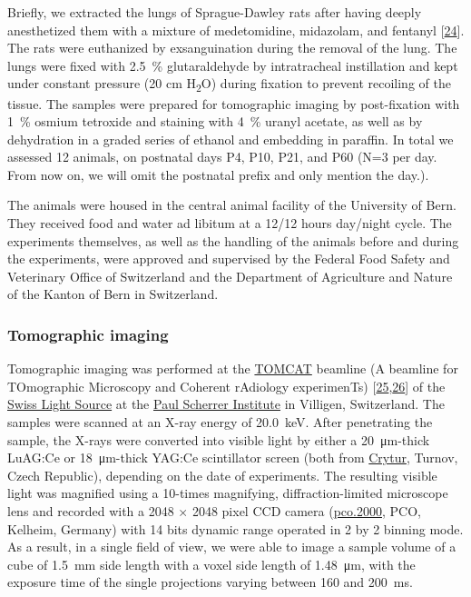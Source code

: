 \documentclass[
  american,
]{article}
\begin{document}
Briefly, we extracted the lungs of Sprague-Dawley rats after having deeply anesthetized them with a mixture of medetomidine, midazolam, and fentanyl {[}\protect\hyperlink{ref-IdRLVLjl}{24}{]}.
The rats were euthanized by exsanguination during the removal of the lung.
The lungs were fixed with 2.5~\% glutaraldehyde by intratracheal instillation and kept under constant pressure (20 cm H\textsubscript{2}O) during fixation to prevent recoiling of the tissue.
The samples were prepared for tomographic imaging by post-fixation with 1~\% osmium tetroxide and staining with 4~\% uranyl acetate, as well as by dehydration in a graded series of ethanol and embedding in paraffin.
In total we assessed 12 animals, on postnatal days P4, P10, P21, and P60 (N=3 per day.
From now on, we will omit the postnatal prefix and only mention the day.).

The animals were housed in the central animal facility of the University of Bern.
They received food and water ad libitum at a 12/12 hours day/night cycle.
The experiments themselves, as well as the handling of the animals before and during the experiments, were approved and supervised by the Federal Food Safety and Veterinary Office of Switzerland and the Department of Agriculture and Nature of the Kanton of Bern in Switzerland.

\hypertarget{tomographic-imaging}{%
\subsubsection{Tomographic imaging}\label{tomographic-imaging}}

Tomographic imaging was performed at the \href{https://www.psi.ch/sls/tomcat/}{TOMCAT} beamline (A beamline for TOmographic Microscopy and Coherent rAdiology experimenTs) {[}\protect\hyperlink{ref-knMAkPPz}{25},\protect\hyperlink{ref-Cp0VRmEj}{26}{]} of the \href{https://www.psi.ch/sls/}{Swiss Light Source} at the \href{https://www.psi.ch/}{Paul Scherrer Institute} in Villigen, Switzerland.
The samples were scanned at an X-ray energy of 20.0~keV.
After penetrating the sample, the X-rays were converted into visible light by either a 20~μm-thick LuAG:Ce or 18~μm-thick YAG:Ce scintillator screen (both from \href{http://www.crytur.cz/}{Crytur}, Turnov, Czech Republic), depending on the date of experiments.
The resulting visible light was magnified using a 10-times magnifying, diffraction-limited microscope lens and recorded with a 2048 × 2048 pixel CCD camera (\href{https://www.pco.de/specialized-cameras/pco2000/}{pco.2000}, PCO, Kelheim, Germany) with 14 bits dynamic range operated in 2 by 2 binning mode.
As a result, in a single field of view, we were able to image a sample volume of a cube of 1.5~mm side length with a voxel side length of 1.48~μm, with the exposure time of the single projections varying between 160 and 200~ms.
\end{document}
